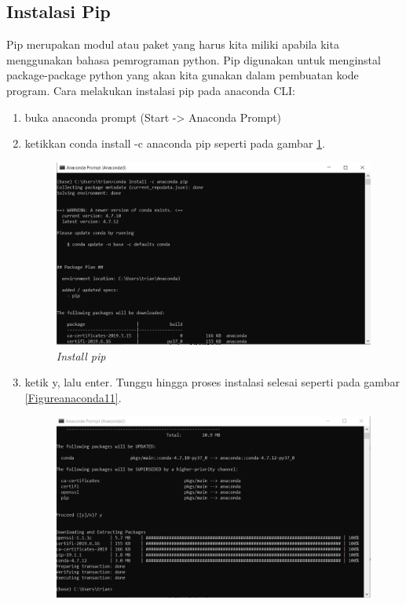\subsection{Instalasi Pip}
Pip merupakan modul atau paket yang harus kita miliki apabila kita menggunakan bahasa pemrograman python. Pip digunakan untuk menginstal package-package python yang akan kita gunakan dalam pembuatan kode program.
Cara melakukan instalasi pip pada anaconda CLI: 
\begin{enumerate}
\item buka anaconda prompt (Start -> Anaconda Prompt)
\item ketikkan conda install -c anaconda pip seperti pada gambar \ref{Figureanaconda10}.
\begin{figure}[H]
    \centering
    \includegraphics[scale=0.4]{figures/installpip}
    \caption{\textit{Install pip}}
    \label{Figureanaconda10}
\end{figure}
\item ketik y, lalu enter. Tunggu hingga proses instalasi selesai seperti pada gambar \ref{Figureanaconda11}.
\begin{figure}[H]
    \centering
    \includegraphics[scale=0.4]{figures/pipselesai}

\end{figure}
\end{enumerate}
